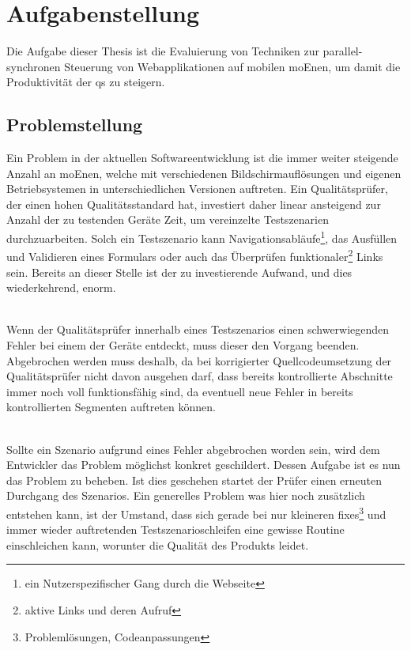 \chapter{Aufgabenstellung}

Die Aufgabe dieser Thesis ist die Evaluierung von Techniken zur \Gls{parallel-synchron}en Steuerung von Webapplikationen auf mobilen \Gls{moEn}en, um damit die Produktivität der \Gls{qs} zu steigern.
	\section{Problemstellung}
	Ein Problem in der aktuellen Softwareentwicklung ist die immer weiter steigende Anzahl an \Gls{moEn}en, welche mit 			verschiedenen Bildschirmauflösungen und eigenen Betriebsystemen in unterschiedlichen Versionen auftreten. Ein 				Qualitätsprüfer, der einen hohen Qualitätsstandard hat, investiert daher linear ansteigend zur Anzahl der zu testenden Geräte Zeit, um vereinzelte Testszenarien durchzuarbeiten. Solch ein Testszenario kann Navigationsabläufe\footnote{ein 		Nutzerspezifischer Gang durch die Webseite}, das Ausfüllen und Validieren eines Formulars oder auch das Überprüfen 			funktionaler\footnote{aktive Links und deren Aufruf} Links sein. Bereits an dieser Stelle ist der zu investierende Aufwand, und dies 		wiederkehrend, enorm.
	
	\\Wenn der Qualitätsprüfer innerhalb eines Testszenarios einen schwerwiegenden Fehler bei einem der Geräte entdeckt, muss 		dieser den Vorgang beenden. Abgebrochen werden muss deshalb, da bei korrigierter Quellcodeumsetzung der Qualitätsprüfer nicht 	davon ausgehen darf, dass bereits kontrollierte Abschnitte immer noch voll funktionsfähig sind, da eventuell neue Fehler in bereits kontrollierten Segmenten auftreten können.
	
	\\Sollte ein Szenario aufgrund eines Fehler abgebrochen worden sein, wird dem Entwickler das Problem möglichst konkret 		geschildert. Dessen Aufgabe ist es nun das Problem zu beheben. Ist dies geschehen startet der Prüfer einen erneuten 			Durchgang des Szenarios. Ein generelles Problem was hier noch zusätzlich entstehen kann, ist der Umstand, dass sich gerade 		bei nur kleineren fixes\footnote{Problemlösungen, Codeanpassungen} und immer wieder auftretenden Testszenarioschleifen 		eine gewisse Routine einschleichen kann, worunter die Qualität des Produkts leidet.

